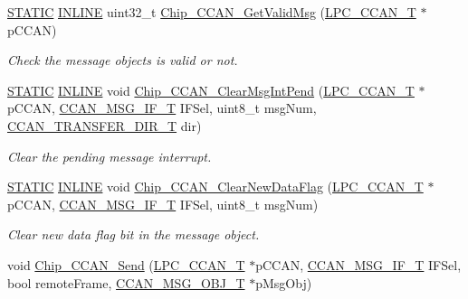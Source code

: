 \begin{DoxyCompactItemize}
\hyperlink{group___l_p_c___types___public___macros_ga10b2d890d871e1489bb02b7e70d9bdfb}{S\+T\+A\+T\+IC} \hyperlink{spifi__18xx__43xx_8h_a2eb6f9e0395b47b8d5e3eeae4fe0c116}{I\+N\+L\+I\+NE} uint32\+\_\+t \hyperlink{group___c_c_a_n__18_x_x__43_x_x_gaf3e7cad0a5b86b9857d20f24531f779a}{Chip\+\_\+\+C\+C\+A\+N\+\_\+\+Get\+Valid\+Msg} (\hyperlink{struct_l_p_c___c_c_a_n___t}{L\+P\+C\+\_\+\+C\+C\+A\+N\+\_\+T} $\ast$p\+C\+C\+AN)
\begin{DoxyCompactList}\small\item\em Check the message objects is valid or not. \end{DoxyCompactList}\item 
\hyperlink{group___l_p_c___types___public___macros_ga10b2d890d871e1489bb02b7e70d9bdfb}{S\+T\+A\+T\+IC} \hyperlink{spifi__18xx__43xx_8h_a2eb6f9e0395b47b8d5e3eeae4fe0c116}{I\+N\+L\+I\+NE} void \hyperlink{group___c_c_a_n__18_x_x__43_x_x_ga6cb155fe27766aa2a654d1eb34fce1f6}{Chip\+\_\+\+C\+C\+A\+N\+\_\+\+Clear\+Msg\+Int\+Pend} (\hyperlink{struct_l_p_c___c_c_a_n___t}{L\+P\+C\+\_\+\+C\+C\+A\+N\+\_\+T} $\ast$p\+C\+C\+AN, \hyperlink{group___c_c_a_n__18_x_x__43_x_x_gac90da0138c430750d2d7d55d4448cae7}{C\+C\+A\+N\+\_\+\+M\+S\+G\+\_\+\+I\+F\+\_\+T} I\+F\+Sel, uint8\+\_\+t msg\+Num, \hyperlink{group___c_c_a_n__18_x_x__43_x_x_gac400be6c4ae22b8b773b0bea6e9c5f02}{C\+C\+A\+N\+\_\+\+T\+R\+A\+N\+S\+F\+E\+R\+\_\+\+D\+I\+R\+\_\+T} dir)
\begin{DoxyCompactList}\small\item\em Clear the pending message interrupt. \end{DoxyCompactList}\item 
\hyperlink{group___l_p_c___types___public___macros_ga10b2d890d871e1489bb02b7e70d9bdfb}{S\+T\+A\+T\+IC} \hyperlink{spifi__18xx__43xx_8h_a2eb6f9e0395b47b8d5e3eeae4fe0c116}{I\+N\+L\+I\+NE} void \hyperlink{group___c_c_a_n__18_x_x__43_x_x_gad65e3ea736abec38609387aa349c6c6f}{Chip\+\_\+\+C\+C\+A\+N\+\_\+\+Clear\+New\+Data\+Flag} (\hyperlink{struct_l_p_c___c_c_a_n___t}{L\+P\+C\+\_\+\+C\+C\+A\+N\+\_\+T} $\ast$p\+C\+C\+AN, \hyperlink{group___c_c_a_n__18_x_x__43_x_x_gac90da0138c430750d2d7d55d4448cae7}{C\+C\+A\+N\+\_\+\+M\+S\+G\+\_\+\+I\+F\+\_\+T} I\+F\+Sel, uint8\+\_\+t msg\+Num)
\begin{DoxyCompactList}\small\item\em Clear new data flag bit in the message object. \end{DoxyCompactList}\item 
void \hyperlink{group___c_c_a_n__18_x_x__43_x_x_ga80123249d183199b1bff05316f6b6c32}{Chip\+\_\+\+C\+C\+A\+N\+\_\+\+Send} (\hyperlink{struct_l_p_c___c_c_a_n___t}{L\+P\+C\+\_\+\+C\+C\+A\+N\+\_\+T} $\ast$p\+C\+C\+AN, \hyperlink{group___c_c_a_n__18_x_x__43_x_x_gac90da0138c430750d2d7d55d4448cae7}{C\+C\+A\+N\+\_\+\+M\+S\+G\+\_\+\+I\+F\+\_\+T} I\+F\+Sel, bool remote\+Frame, \hyperlink{struct_c_c_a_n___m_s_g___o_b_j___t}{C\+C\+A\+N\+\_\+\+M\+S\+G\+\_\+\+O\+B\+J\+\_\+T} $\ast$p\+Msg\+Obj)

\end{DoxyCompactItemize}
